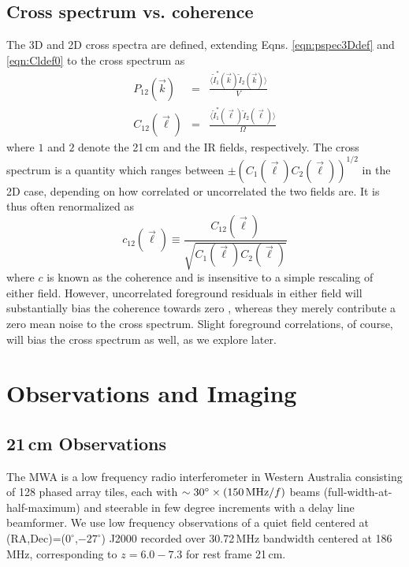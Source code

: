 \documentclass[numberedappendix]{emulateapj}
\begin{document}
\subsection{Cross spectrum vs. coherence}

The 3D and 2D cross spectra are defined, extending Eqns. \ref{eqn:pspec3Ddef} and \ref{eqn:Cldef0} to the cross spectrum as
\begin{eqnarray}
	P_{12}(\vec{k}) &=& \frac{\langle\tilde{I}_1^*(\vec{k})\tilde{I}_2(\vec{k})\rangle}{V}\\
	C_{12}(\vec{\ell}) &=& \frac{\langle \tilde{I}_1^*(\vec{\ell})\tilde{I}_2(\vec{\ell})\rangle}{\Omega}
\end{eqnarray}
where $1$ and $2$ denote the 21\,cm and the IR fields, respectively. The cross spectrum is a quantity which ranges between $\pm(C_{1}(\vec{\ell})C_{2}(\vec{\ell}))^{1/2}$ in the 2D case, depending on how correlated or uncorrelated the two fields are. It is thus often renormalized as  
\begin{equation}
\label{eqn:Cldefcross}
	c_{12}(\vec{\ell}) \equiv \frac{C_{12}(\vec{\ell}) }{\sqrt{C_1(\vec{\ell})  C_2(\vec{\ell}) }}
\end{equation}
where $c$ is known as the coherence and is insensitive to a simple rescaling of either field. However, uncorrelated foreground residuals in either field will substantially bias the coherence towards zero \citep{lidz09,furlanettolidz07}, whereas they merely contribute a zero mean noise to the cross spectrum. Slight foreground correlations, of course, will bias the cross spectrum as well, as we explore later. 

\section{Observations and Imaging}
\subsection{21\,cm Observations}
\label{sec:mwaobservations}

The MWA is a low frequency radio interferometer in Western Australia consisting of 128 phased array tiles, each with $\sim30^\circ\times(150\text{\,MHz}/f)$  beams (full-width-at-half-maximum) and steerable in few degree increments with a delay line beamformer. We use low frequency observations of a quiet field centered at (RA,Dec)=($0^\circ$,$-27^\circ$) J2000 recorded over 30.72\,MHz bandwidth centered at 186\,MHz, corresponding to $z=6.0-7.3$ for rest frame 21\,cm. 
\end{document}
